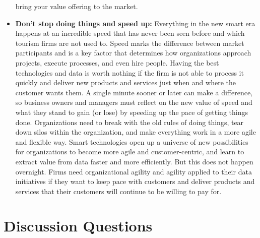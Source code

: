 \documentclass[
  letterpaper,
  DIV=11,
  numbers=noendperiod]{scrreprt}
\begin{document}
\begin{itemize}
  bring your value offering to the market.
\item
  \textbf{Don't stop doing things and speed up:} Everything in the new
  smart era happens at an incredible speed that has never been seen
  before and which tourism firms are not used to. Speed marks the
  difference between market participants and is a key factor that
  determines how organizations approach projects, execute processes, and
  even hire people. Having the best technologies and data is worth
  nothing if the firm is not able to process it quickly and deliver new
  products and services just when and where the customer wants them. A
  single minute sooner or later can make a difference, so business
  owners and managers must reflect on the new value of speed and what
  they stand to gain (or lose) by speeding up the pace of getting things
  done. Organizations need to break with the old rules of doing things,
  tear down silos within the organization, and make everything work in a
  more agile and flexible way. Smart technologies open up a universe of
  new possibilities for organizations to become more agile and
  customer-centric, and learn to extract value from data faster and more
  efficiently. But this does not happen overnight. Firms need
  organizational agility and agility applied to their data initiatives
  if they want to keep pace with customers and deliver products and
  services that their customers will continue to be willing to pay for.
\end{itemize}

\hypertarget{discussion-questions-11}{%
\section{Discussion Questions}\label{discussion-questions-11}}
\end{document}
